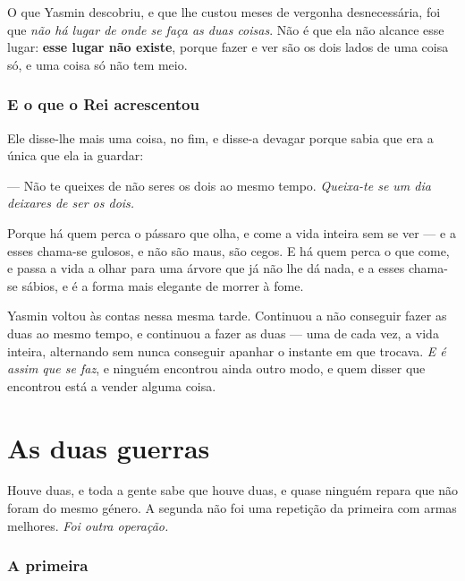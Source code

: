 \documentclass[livro.tex]{subfiles}
\begin{document}
\medskip

O que Yasmin descobriu, e que lhe custou meses de vergonha desnecessária, foi que \emph{não há
lugar de onde se faça as duas coisas}. Não é que ela não alcance esse lugar: \textbf{esse lugar
não existe}, porque fazer e ver são os dois lados de uma coisa só, e uma coisa só não tem meio.

\subsection*{E o que o Rei acrescentou}

Ele disse-lhe mais uma coisa, no fim, e disse-a devagar porque sabia que era a única que ela ia
guardar:

\medskip

--- Não te queixes de não seres os dois ao mesmo tempo. \emph{Queixa-te se um dia deixares de ser
os dois.}

\medskip

Porque há quem perca o pássaro que olha, e come a vida inteira sem se ver --- e a esses chama-se
gulosos, e não são maus, são cegos. E há quem perca o que come, e passa a vida a olhar para uma
árvore que já não lhe dá nada, e a esses chama-se sábios, e é a forma mais elegante de morrer à
fome.

\medskip

Yasmin voltou às contas nessa mesma tarde. Continuou a não conseguir fazer as duas ao mesmo tempo,
e continuou a fazer as duas --- uma de cada vez, a vida inteira, alternando sem nunca conseguir
apanhar o instante em que trocava. \emph{E é assim que se faz}, e ninguém encontrou ainda outro
modo, e quem disser que encontrou está a vender alguma coisa.


\chapter{As duas guerras}

Houve duas, e toda a gente sabe que houve duas, e quase ninguém repara que não foram do mesmo
género. A segunda não foi uma repetição da primeira com armas melhores. \emph{Foi outra operação.}

\subsection*{A primeira}
\end{document}
